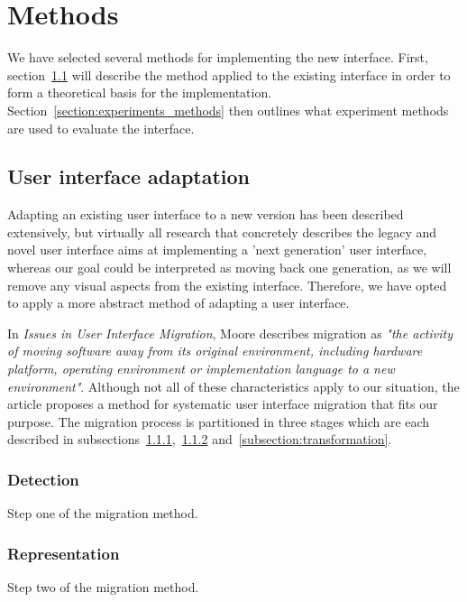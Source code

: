 \chapter{Methods}
\label{chapter:methods}
We have selected several methods for implementing the new interface. First, section~\ref{section:userinterfaceadaptation} will describe the method applied to the existing interface in order to form a theoretical basis for the implementation. Section~\ref{section:experiments_methods} then outlines what experiment methods are used to evaluate the interface.

\section{User interface adaptation}
\label{section:userinterfaceadaptation}
Adapting an existing user interface to a new version has been described extensively\cite{classen1997cui, csaba1997experience, kong2000legacy}, but virtually all research that concretely describes the legacy and novel user interface aims at implementing a 'next generation' user interface, whereas our goal could be interpreted as moving back one generation, as we will remove any visual aspects from the existing interface. Therefore, we have opted to apply a more abstract method of adapting a user interface.

In \textit{Issues in User Interface Migration}, Moore describes migration as \textit{"the activity of moving software away from its original environment, including hardware platform, operating environment or implementation language to a new environment"}\cite{moore1993issues}. Although not all of these characteristics apply to our situation, the article proposes a method for systematic user interface migration that fits our purpose. The migration process is partitioned in three stages which are each described in subsections~\ref{subsection:detection},~\ref{subsection:representation} and~\ref{subsection:transformation}.

\subsection{Detection}
\label{subsection:detection}
Step one of the migration method.

\subsection{Representation}
\label{subsection:representation}
Step two of the migration method.

